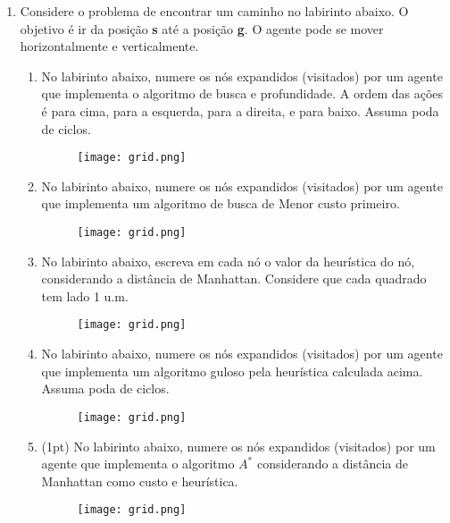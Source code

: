\documentclass{article}
\begin{document}
\begin{enumerate}

\item Considere o problema de encontrar um caminho no labirinto abaixo. O objetivo é ir da posição \textbf{s} até a posição \textbf{g}. O agente pode se mover horizontalmente e verticalmente. 
    
\begin{enumerate}
    
    \item No labirinto abaixo, numere os nós expandidos (visitados) por um agente que implementa o algoritmo de busca e profundidade. A ordem das ações é para cima, para a esquerda, para a direita, e para baixo. Assuma poda de ciclos.
    \begin{figure}[!ht]
        \centering
        \texttt{[image: grid.png]}
    \end{figure}
    
\pagebreak

    \item No labirinto abaixo, numere os nós expandidos (visitados) por um agente que implementa um algoritmo de busca de Menor custo primeiro.
    \begin{figure}[!ht]
        \centering
        \texttt{[image: grid.png]}
    \end{figure}

    \item No labirinto abaixo, escreva em cada nó o valor da heurística do nó, considerando a distância de Manhattan. Considere que cada quadrado tem lado 1 u.m.
    \begin{figure}[!ht]
        \centering
        \texttt{[image: grid.png]}
    \end{figure}
    
    \pagebreak
    \item No labirinto abaixo, numere os nós expandidos (visitados) por um agente que implementa um algoritmo guloso pela heurística calculada acima. Assuma poda de ciclos.
    \begin{figure}[!ht]
        \centering
        \texttt{[image: grid.png]}
    \end{figure}
    
    \vspace{2cm}
    
    \item (1pt) No labirinto abaixo, numere os nós expandidos (visitados) por um agente que implementa o algoritmo $A^*$ considerando a distância de Manhattan como custo e heurística.
    \begin{figure}[!ht]
        \centering
        \texttt{[image: grid.png]}
    \end{figure}
    
\end{enumerate}
\end{enumerate}
\end{document}
